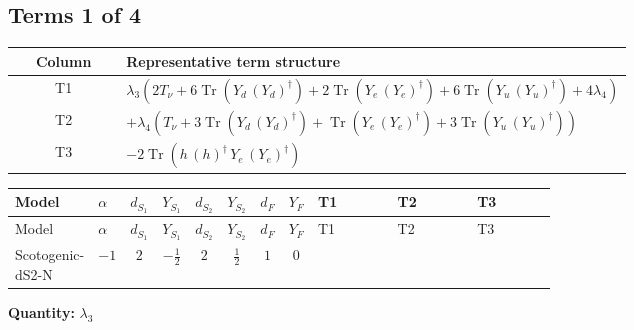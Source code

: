 \documentclass[8pt]{article}
\begin{document}
\begin{landscape}
\subsection*{Terms 1 of 4}
\begin{center}
\begin{tabular}{@{}c >{\raggedright\arraybackslash}p{0.82\linewidth}@{}}
\toprule
Column & Representative term structure \\
\midrule
T1 & \(\displaystyle {\lambda_3} (2 T_\nu+6 \operatorname{Tr}\!\left({Y_d}\,\left({Y_d}\right)^{\dagger}\right)+2 \operatorname{Tr}\!\left({Y_e}\,\left({Y_e}\right)^{\dagger}\right)+6 \operatorname{Tr}\!\left({Y_u}\,\left({Y_u}\right)^{\dagger}\right)+4 {\lambda_4})\) \\
\midrule
T2 & \(\displaystyle +{\lambda_4} (T_\nu+3 \operatorname{Tr}\!\left({Y_d}\,\left({Y_d}\right)^{\dagger}\right)+\operatorname{Tr}\!\left({Y_e}\,\left({Y_e}\right)^{\dagger}\right)+3 \operatorname{Tr}\!\left({Y_u}\,\left({Y_u}\right)^{\dagger}\right))\) \\
\midrule
T3 & \(\displaystyle -2 \operatorname{Tr}\!\left({h}\,\left({h}\right)^{\dagger}\,{Y_e}\,\left({Y_e}\right)^{\dagger}\right)\) \\
\midrule
\bottomrule
\end{tabular}
\end{center}
\smallskip
\tiny
\begin{longtable}{@{}llcccccc >{\raggedright\arraybackslash}p{0.21\linewidth} >{\raggedright\arraybackslash}p{0.21\linewidth} >{\raggedright\arraybackslash}p{0.21\linewidth}@{}}
\toprule
Model & $\alpha$ & $d_{S_1}$ & $Y_{S_1}$ & $d_{S_2}$ & $Y_{S_2}$ & $d_F$ & $Y_F$ & T1 & T2 & T3 \\
\midrule
\endfirsthead
\toprule
Model & $\alpha$ & $d_{S_1}$ & $Y_{S_1}$ & $d_{S_2}$ & $Y_{S_2}$ & $d_F$ & $Y_F$ & T1 & T2 & T3 \\
\midrule
\endhead
Scotogenic-dS2-N & $-1$ & $2$ & $-\frac{1}{2}$ & $2$ & $\frac{1}{2}$ & $1$ & $0$ & \scriptsize\adjustbox{max width=\linewidth}{$\begin{gathered} {\lambda_3} (2 T_\nu+6 \operatorname{Tr}\!\left({Y_d}\,\left({Y_d}\right)^{\dagger}\right)+2 \operatorname{Tr}\!\left({Y_e}\,\left({Y_e}\right)^{\dagger}\right)+6 \operatorname{Tr}\!\left({Y_u}\,\left({Y_u}\right)^{\dagger}\right)+4 {\lambda_4})\end{gathered}$} & \scriptsize\adjustbox{max width=\linewidth}{$\begin{gathered} +{\lambda_4} (T_\nu+3 \operatorname{Tr}\!\left({Y_d}\,\left({Y_d}\right)^{\dagger}\right)+\operatorname{Tr}\!\left({Y_e}\,\left({Y_e}\right)^{\dagger}\right)+3 \operatorname{Tr}\!\left({Y_u}\,\left({Y_u}\right)^{\dagger}\right))\end{gathered}$} & \scriptsize\adjustbox{max width=\linewidth}{$\begin{gathered} -2 \operatorname{Tr}\!\left({h}\,\left({h}\right)^{\dagger}\,{Y_e}\,\left({Y_e}\right)^{\dagger}\right)\end{gathered}$} \\
\midrule
\bottomrule
\end{longtable}
\clearpage
\noindent\textbf{Quantity: }$\lambda_3$\par\smallskip

\end{landscape}
\end{document}
